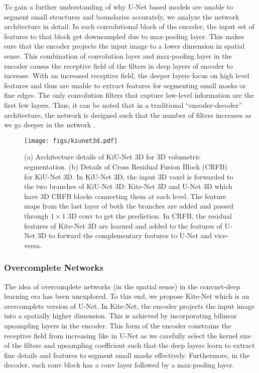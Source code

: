 \documentclass[journal,twoside,web]{ieeecolor}
\begin{document}
To gain a further understanding of why U-Net based models are unable to segment small structures and boundaries accurately, we analyze the network architecture in detail.   In each convolutional block of the encoder, the input set of features to that block get downsampled due to max-pooling layer. This makes sure that the encoder projects the input image to a lower dimension in spatial sense. This combination of convolution layer and max-pooling layer in the encoder causes the receptive field of the filters in deep layers of encoder to increase. With an increased receptive field, the deeper layers focus on high level features and thus are unable to extract features for segmenting small masks or fine edges. The only convolution filters that capture low-level information are the first few  layers. Thus, it can be noted that in a traditional ``encoder-decoder'' architecture, the network is designed such that the number of filters increases as we go deeper in the network \cite{jose2020kiu}.



\begin{figure*}[htbp]
	\centering
	\texttt{[image: figs/kiunet3d.pdf]}\\
	\caption{(a) Architecture details of KiU-Net 3D for 3D volumetric segmentation. (b) Details of Cross Residual Fusion Block (CRFB) for KiU-Net 3D. In KiU-Net 3D, the input 3D voxel is forwarded to the two branches of KiU-Net 3D: Kite-Net 3D and U-Net 3D which have 3D CRFB blocks connecting them at each level. The feature maps from the last layer of both the branches are added and passed through $1 \times 1$ 3D conv to get the prediction. In CRFB, the residual features of Kite-Net 3D are learned and added to the features of U-Net 3D to forward the complementary features to U-Net and vice-versa.}
	\label{arch2}
\end{figure*}




\subsubsection{Overcomplete Networks}




The idea of overcomplete networks (in the spatial sense) in the convnet-deep learning era has been unexplored. To this end, we propose Kite-Net which is an overcomplete version of U-Net. In Kite-Net, the encoder   projects the input image into a spatially higher dimension. This is achieved by incorporating  bilinear upsampling layers in the encoder. This form of the encoder  constrains the receptive field from increasing like in U-Net as we carefully select the kernel size of the filters and upsampling coefficient such that the deep layers learn to extract fine details and features to segment small masks effectively. Furthermore, in the decoder, each conv block has a conv layer followed by a max-pooling layer. 
\end{document}
